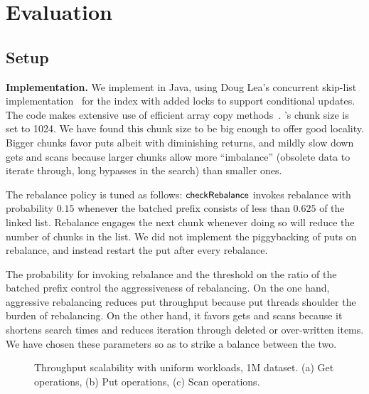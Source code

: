\section{Evaluation}
\label{sec:eval}

\subsection{Setup}

{\bf Implementation.} We implement {\kiwi} in Java, using Doug Lea's concurrent skip-list 
implementation~\cite{JavaConcurrentSkipList} for the index with added locks to support conditional updates. 
The code makes extensive use of efficient 
array copy methods~\cite{JavaArrayCopy}. {\kiwi}'s chunk size is set to 1024. 
We have found this chunk size to be big enough to offer good locality. Bigger chunks favor puts 
albeit with diminishing returns, and mildly slow down gets and scans because larger chunks 
allow more ``imbalance''  (obsolete data  to iterate through, long bypasses in the search) than smaller ones.

The rebalance policy is tuned as follows:
$\code{checkRebalance}$  invokes rebalance with probability $0.15$ whenever
the batched prefix consists of less than $0.625$ of the linked list. Rebalance 
engages the next chunk whenever doing so will reduce the number of chunks in the list. 
We did not implement the piggybacking of puts on rebalance, and instead restart the put after every rebalance.

The probability for invoking rebalance and the threshold on the ratio of the batched prefix control the aggressiveness of rebalancing. 
On the one hand, aggressive rebalancing reduces put throughput because put threads shoulder the burden of rebalancing. 
On the other hand, it favors gets and scans because it shortens search times and reduces iteration through deleted or over-written items. 
We have chosen these parameters so as to strike a balance between the two. 

\begin{figure*}
\begin{center}

\end{center}
\caption{Throughput scalability with uniform workloads, 1M dataset. (a) Get operations, (b) Put operations, (c) Scan operations. }
\label{evaluation:results:getputscan}
\end{figure*}

